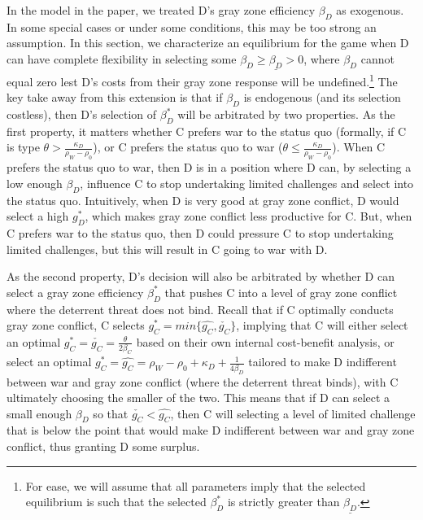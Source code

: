 \documentclass[
]{article}
\begin{document}
In the model in the paper, we treated D's gray zone efficiency \(\beta_{D}\) as exogenous. In some special cases or under some conditions, this may be too strong an assumption. In this section, we characterize an equilibrium for the game when D can have complete flexibility in selecting some \(\beta_{D}\geq\underline{\beta_{D}}>0\), where \(\beta_{D}\) cannot equal zero lest D's costs from their gray zone response will be undefined.\footnote{For ease, we will assume that all parameters imply that the selected equilibrium is such that the selected $\beta_{D}^{*}$ is strictly greater than $\underline{\beta_{D}}$.} The key take away from this extension is that if \(\beta_{D}\) is endogenous (and its selection costless), then D's selection of \(\beta_{D}^{*}\) will be arbitrated by two properties. As the first property, it matters whether C prefers war to the status quo (formally, if C is type \(\theta>\frac{\kappa_{D}}{\rho_{W}-\rho_{0}}\)), or C prefers the status quo to war (\(\theta\leq\frac{\kappa_{D}}{\rho_{W}-\rho_{0}}\)). When C prefers the status quo to war, then D is in a position where D can, by selecting a low enough \(\beta_{D}\), influence C to stop undertaking limited challenges and select into the status quo. Intuitively, when D is very good at gray zone conflict, D would select a high \(g_{D}^{*}\), which makes gray zone conflict less productive for C. But, when C prefers war to the status quo, then D could pressure C to stop undertaking limited challenges, but this will result in C going to war with D.

As the second property, D's decision will also be arbitrated by whether D can select a gray zone efficiency \(\beta_{D}^{*}\) that pushes C into a level of gray zone conflict where the deterrent threat does not bind. Recall that if C optimally conducts gray zone conflict, C selects \(g_{C}^{*}=min\{\hat{g_{C}},\check{g_{C}}\}\), implying that C will either select an optimal \(g_{C}^{*}=\check{g_{C}}=\frac{\theta}{2\beta_{C}}\) based on their own internal cost-benefit analysis, or select an optimal \(g_{C}^{*}=\hat{g_{C}}=\rho_{W}-\rho_{0}+\kappa_{D}+\frac{1}{4\beta_{D}}\) tailored to make D indifferent between war and gray zone conflict (where the deterrent threat binds), with C ultimately choosing the smaller of the two. This means that if D can select a small enough \(\beta_{D}\) so that \(\check{g_{C}}<\hat{g_{C}}\), then C will selecting a level of limited challenge that is below the point that would make D indifferent between war and gray zone conflict, thus granting D some surplus.
\end{document}
